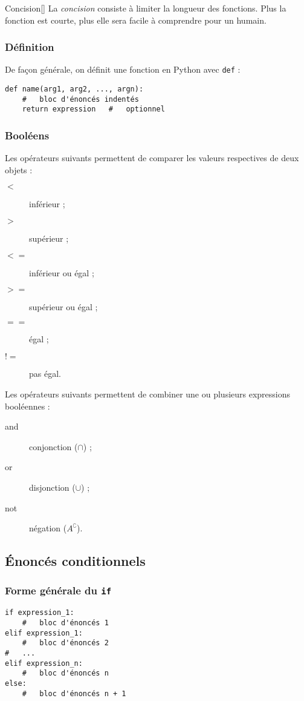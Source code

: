 \documentclass[10pt, french]{article}
\begin{document}
\begin{multicols*}{2}
\begin{definitionGENERAL}{Concision}[]
La \textit{\textit{concision}} consiste à limiter la longueur des fonctions. Plus la fonction est courte, plus elle sera facile à comprendre pour un humain.
\end{definitionGENERAL}


\subsubsection{Définition}
De façon générale, on définit une fonction en Python avec \texttt{def} :
\begin{lstlisting}
def name(arg1, arg2, ..., argn):
	#	bloc d'énoncés indentés
	return expression	#	optionnel
\end{lstlisting}



\subsubsection{Booléens}
Les opérateurs suivants permettent de comparer les valeurs respectives de deux objets : 
\begin{description}
	\item[$<$]	inférieur ;
	\item[$>$]	supérieur ;
	\item[$<=$]	inférieur ou égal ;
	\item[$>=$]	supérieur ou égal ;
	\item[$==$]	égal ;
	\item[$!=$]	pas égal.
\end{description}

\bigskip

Les opérateurs suivants permettent de combiner une ou plusieurs expressions booléennes : 
\begin{description}
	\item[and]	conjonction ($\cap$) ;
	\item[or]	disjonction ($\cup$) ;
	\item[not]	négation ($A^{\complement}$).
\end{description}

\subsection{Énoncés conditionnels}
\subsubsection{Forme générale du \texttt{if}}
\begin{lstlisting}
if expression_1:
	#	bloc d'énoncés 1
elif expression_1:
	#	bloc d'énoncés 2
#	...
elif expression_n:
	#	bloc d'énoncés n
else:
	#	bloc d'énoncés n + 1
\end{lstlisting}


\end{multicols*}
\end{document}
